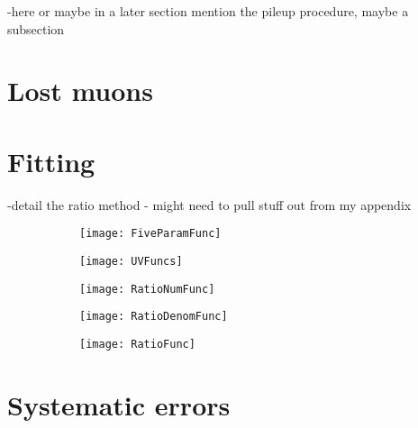 -here or maybe in a later section mention the pileup procedure, maybe a subsection


\section{Lost muons}
\label{sec:lostmuons}

\section{Fitting}
\label{sec:Fitting}


-detail the ratio method - might need to pull stuff out from my appendix


    \begin{figure}[]
    \centering
        \begin{subfigure}[t]{0.45\textwidth}
            \centering
            \texttt{[image: FiveParamFunc]}
            \caption{}
        \end{subfigure}%

        \vspace{2mm}
        \begin{subfigure}[t]{0.45\textwidth}
            \centering
            \texttt{[image: UVFuncs]}
            \caption{}
        \end{subfigure}
        \begin{subfigure}[t]{0.45\textwidth}
            \centering
            \texttt{[image: RatioNumFunc]}
            \caption{}
        \end{subfigure}%
        \vspace{2mm}
        \begin{subfigure}[t]{0.45\textwidth}
            \centering
            \texttt{[image: RatioDenomFunc]}
            \caption{}
        \end{subfigure}
        \begin{subfigure}[t]{0.45\textwidth}
            \centering
            \texttt{[image: RatioFunc]}
            \caption{}
        \end{subfigure}%
    \caption[]{}
    \label{}
    \end{figure}






\section{Systematic errors}
\label{sec:Systematic Errors}



\cleardoublepage

